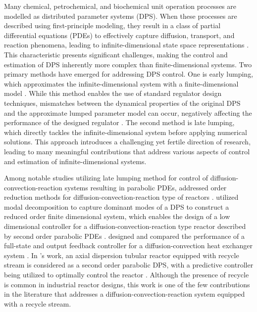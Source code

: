 Many chemical, petrochemical, and biochemical unit operation processes are modelled as distributed parameter systems (DPS). When these processes are described using first-principle modeling, they result in a class of partial differential equations (PDEs) to effectively capture diffusion, transport, and reaction phenomena, leading to infinite-dimensional state space representations \autocite{ray1981advanced,christofides1998robust}. This characteristic presents significant challenges, making the control and estimation of DPS inherently more complex than finite-dimensional systems. Two primary methods have emerged for addressing DPS control. One is early lumping, which approximates the infinite-dimensional system with a finite-dimensional model \autocite{davison1976robust, francis1977linear}. While this method enables the use of standard regulator design techniques, mismatches between the dynamical properties of the original DPS and the approximate lumped parameter model can occur, negatively affecting the performance of the designed regulator \autocite{moghadam2012infinite}. The second method is late lumping, which directly tackles the infinite-dimensional system before applying numerical solutions. This approach introduces a challenging yet fertile direction of research, leading to many meaningful contributions that address various aspects of control and estimation of infinite-dimensional systems.

Among notable studies utilizing late lumping method for control of diffusion-convection-reaction systems resulting in parabolic PDEs,  addressed order reduction methods for diffusion-convection-reaction type of reactors \autocite{Christofides2012book}.  utilized modal decomposition to capture dominant modes of a DPS to construct a reduced order finite dimensional system, which enables the design of a low dimensional controller for a diffusion-convection-reaction type reactor described by second order parabolic PDEs \autocite{dubljevic2006predictive2}.  designed and compared the performance of a full-state and output feedback controller for a diffusion-convection heat exchanger system \autocite{ozorio2019heat}. In 's work, an axial dispersion tubular reactor equipped with recycle stream is considered as a second order parabolic DPS, with a predictive controller being utilized to optimally control the reactor \autocite{khatibi2021model}.  Although the presence of recycle is common in industrial reactor designs, this work is one of the few contributions in the literature that addresses a diffusion-convection-reaction system equipped with a recycle stream.

